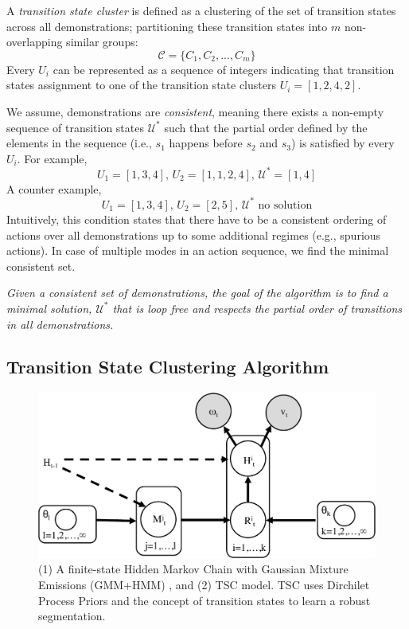 A \emph{transition state cluster} is
defined as a clustering of the set of transition states across all demonstrations; partitioning these transition states into $m$ non-overlapping similar groups:
\[
\mathcal{C} = \{C_1, C_2,...,C_m\}
\]
Every $U_i$ can be represented as a sequence of integers indicating that transition states assignment to one of the transition state clusters $U_i=[1,2,4,2]$.

We assume, demonstrations are \emph{consistent}, meaning there exists a non-empty sequence of transition states $\mathcal{U}^*$ such that the partial order defined by the elements in the sequence (i.e., $s_1$ happens before $s_2$ and $s_3$) is satisfied by every $U_i$. For example, 
\[U_1 = [1,3,4]\text{, }U_2 = [1,1,2,4]\text{, }\mathcal{U}^*=[1,4] \]
A counter example,
\[U_1 = [1,3,4]\text{, }U_2 = [2,5]\text{, }\mathcal{U}^*\text{  no solution} \]
Intuitively, this condition states that there have to be a consistent ordering of actions over all demonstrations up to some additional regimes (e.g., spurious actions). 
In case of multiple modes in an action sequence, we find the minimal consistent set.


\noindent \emph{Given a consistent set of demonstrations, the goal of the algorithm is to find a minimal solution, $\mathcal{U}^*$ that is loop free and respects the partial order of transitions in all demonstrations.}

\subsection{Transition State Clustering Algorithm}

\begin{figure}[t!]
\centering
\includegraphics[width=\linewidth]{figures/pgm.pdf}
\caption{ (1) A finite-state Hidden Markov Chain with Gaussian Mixture Emissions (GMM+HMM) , and (2) TSC model. TSC uses Dirchilet Process Priors and the concept of transition states to learn a robust segmentation. }
\label{fig:tsc-pgm}
\vspace{-10pt}
\end{figure}


